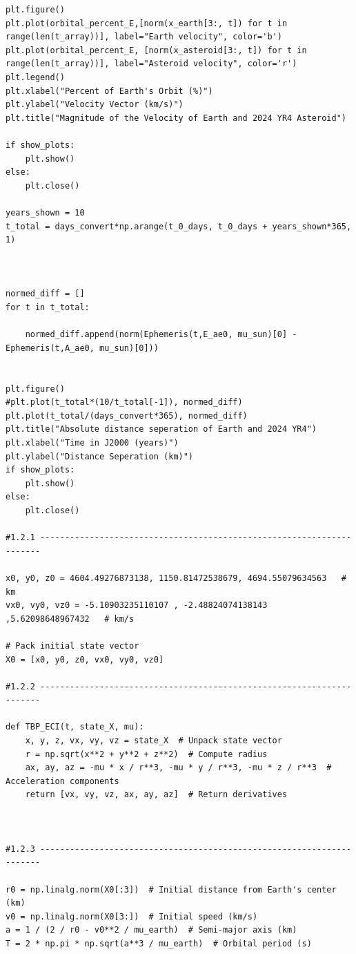 \documentclass[12pt,twocolumn]{article}  %
\begin{document}
\begin{verbatim}
plt.figure()
plt.plot(orbital_percent_E,[norm(x_earth[3:, t]) for t in range(len(t_array))], label="Earth velocity", color='b')
plt.plot(orbital_percent_E, [norm(x_asteroid[3:, t]) for t in range(len(t_array))], label="Asteroid velocity", color='r')
plt.legend()
plt.xlabel("Percent of Earth's Orbit (%)")
plt.ylabel("Velocity Vector (km/s)")
plt.title("Magnitude of the Velocity of Earth and 2024 YR4 Asteroid")

if show_plots:
    plt.show()
else:
    plt.close()
    
years_shown = 10
t_total = days_convert*np.arange(t_0_days, t_0_days + years_shown*365, 1)



normed_diff = []
for t in t_total:
    
    normed_diff.append(norm(Ephemeris(t,E_ae0, mu_sun)[0] - Ephemeris(t,A_ae0, mu_sun)[0]))
    
    
plt.figure()
#plt.plot(t_total*(10/t_total[-1]), normed_diff)
plt.plot(t_total/(days_convert*365), normed_diff)
plt.title("Absolute distance seperation of Earth and 2024 YR4")
plt.xlabel("Time in J2000 (years)")
plt.ylabel("Distance Seperation (km)")
if show_plots:
    plt.show()
else:
    plt.close()

#1.2.1 ----------------------------------------------------------------------

x0, y0, z0 = 4604.49276873138, 1150.81472538679, 4694.55079634563   # km
vx0, vy0, vz0 = -5.10903235110107 , -2.48824074138143 ,5.62098648967432   # km/s

# Pack initial state vector
X0 = [x0, y0, z0, vx0, vy0, vz0]    

#1.2.2 ----------------------------------------------------------------------

def TBP_ECI(t, state_X, mu):
    x, y, z, vx, vy, vz = state_X  # Unpack state vector
    r = np.sqrt(x**2 + y**2 + z**2)  # Compute radius
    ax, ay, az = -mu * x / r**3, -mu * y / r**3, -mu * z / r**3  # Acceleration components
    return [vx, vy, vz, ax, ay, az]  # Return derivatives



#1.2.3 ----------------------------------------------------------------------

r0 = np.linalg.norm(X0[:3])  # Initial distance from Earth's center (km)
v0 = np.linalg.norm(X0[3:])  # Initial speed (km/s)
a = 1 / (2 / r0 - v0**2 / mu_earth)  # Semi-major axis (km)
T = 2 * np.pi * np.sqrt(a**3 / mu_earth)  # Orbital period (s)


\end{verbatim}
\end{document}
